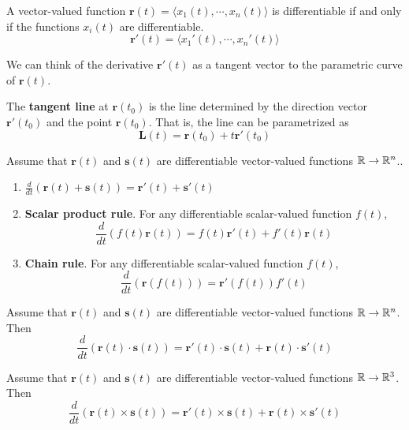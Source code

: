 \begin{theorem}
    A vector-valued function $\bm{r}(t)= \langle x_1(t), \cdots, x_n(t) \rangle$ is differentiable if and only if the functions $x_i(t)$ are differentiable.
     $$\bm{r}'(t) = \langle x_1'(t), \cdots, x_n'(t) \rangle$$
\end{theorem}

    We can think of the derivative $\bm{r}'(t)$ as a tangent vector to the parametric curve of $\bm{r}(t)$.


\begin{definition}
    The \textbf{tangent line} at $\bm{r}(t_0)$ is the line determined by the direction vector $\bm{r}'(t_0)$ and the point $\bm{r}(t_0)$.  That is, the line can be parametrized as 
    $$\bm{L}(t) = \bm{r}(t_0) + t\bm{r}'(t_0)$$
    \end{definition}


\begin{theorem}
       Assume that $\bm{r}(t)$ and $\bm{s}(t)$ are differentiable vector-valued functions $\mathbb{R} \to \mathbb{R}^n$..
       
      \begin{enumerate}
        \item $\frac{d}{dt}(\bm{r}(t) + \bm{s}(t)) = \bm{r}'(t) + \bm{s}'(t)$ 
        \item \textbf{Scalar product rule}. For any differentiable scalar-valued function $f(t)$, 
        $$\frac{d}{dt}(f(t)\bm{r}(t)) = f(t)\bm{r}'(t) + f'(t)\bm{r}(t)$$   
        \vspace{-1em}
        \item \textbf{Chain rule}. For any differentiable scalar-valued function $f(t)$, $$\frac{d}{dt}(\bm{r}(f(t))) =  \bm{r}'(f(t))f'(t)$$  
    \end{enumerate}
    \end{theorem}

\begin{theorem}
       Assume that $\bm{r}(t)$ and $\bm{s}(t)$ are differentiable vector-valued functions $\mathbb{R} \to \mathbb{R}^n$. Then
       $$\frac{d}{dt}(\bm{r}(t) \cdot \bm{s}(t)) = \bm{r}'(t)\cdot\bm{s}(t) + \bm{r}(t)\cdot\bm{s}'(t)$$ 
    \end{theorem}
    
       
    \begin{theorem}
       Assume that $\bm{r}(t)$ and $\bm{s}(t)$ are differentiable vector-valued functions $\mathbb{R} \to \mathbb{R}^3$. Then 
       $$\frac{d}{dt}(\bm{r}(t) \times \bm{s}(t)) = \bm{r}'(t)\times \bm{s}(t) + \bm{r}(t)\times \bm{s}'(t)$$
    \end{theorem}

